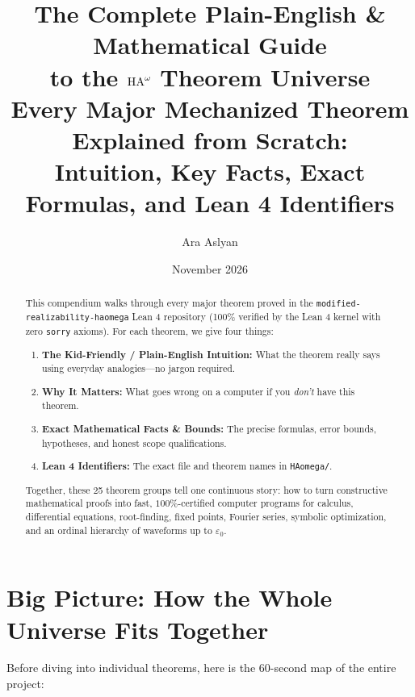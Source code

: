 \documentclass[11pt,a4paper]{article}
\title{\textbf{The Complete Plain-English \& Mathematical Guide\\
to the \texorpdfstring{$\mathrm{HA}^{\omega}$}{HAomega} Theorem Universe}\\[6pt]
\large Every Major Mechanized Theorem Explained from Scratch:\\
Intuition, Key Facts, Exact Formulas, and Lean 4 Identifiers}
\author{Ara Aslyan}
\date{November 2026}
\newcommand{\lean}[1]{\texttt{\nolinkurl{#1}}}
\begin{document}
\maketitle

\begin{abstract}
This compendium walks through every major theorem proved in the \lean{modified-realizability-haomega} Lean 4 repository (100\% verified by the Lean 4 kernel with zero \lean{sorry} axioms). For each theorem, we give four things:
\begin{enumerate}
  \item \textbf{The Kid-Friendly / Plain-English Intuition:} What the theorem really says using everyday analogies---no jargon required.
  \item \textbf{Why It Matters:} What goes wrong on a computer if you \emph{don't} have this theorem.
  \item \textbf{Exact Mathematical Facts \& Bounds:} The precise formulas, error bounds, hypotheses, and honest scope qualifications.
  \item \textbf{Lean 4 Identifiers:} The exact file and theorem names in \lean{HAomega/}.
\end{enumerate}
Together, these 25 theorem groups tell one continuous story: how to turn constructive mathematical proofs into fast, $100\%$-certified computer programs for calculus, differential equations, root-finding, fixed points, Fourier series, symbolic optimization, and an ordinal hierarchy of waveforms up to $\varepsilon_0$.
\end{abstract}

\tableofcontents
\newpage

\section{Big Picture: How the Whole Universe Fits Together}

Before diving into individual theorems, here is the 60-second map of the entire project:
\end{document}
